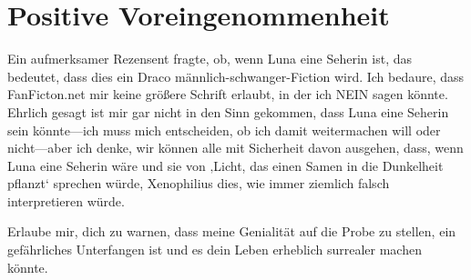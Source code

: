 \chapter{Positive Voreingenommenheit}

\begin{chapterOpeningAuthorNote}
% 
Ein aufmerksamer Rezensent fragte, ob, wenn Luna eine Seherin ist, das bedeutet, dass dies ein Draco männlich-schwanger-Fiction wird. Ich bedaure, dass FanFicton.net mir keine größere Schrift erlaubt, in der ich NEIN sagen könnte. Ehrlich gesagt ist mir gar nicht in den Sinn gekommen, dass Luna eine Seherin sein könnte—ich muss mich entscheiden, ob ich damit weitermachen will oder nicht—aber ich denke, wir können alle mit Sicherheit davon ausgehen, dass, wenn Luna eine Seherin wäre und sie von ‚Licht, das einen Samen in die Dunkelheit pflanzt‘ sprechen würde, Xenophilius dies, wie immer ziemlich falsch interpretieren würde.
\end{chapterOpeningAuthorNote}
\begin{chapterOpeningQuote}
Erlaube mir, dich zu warnen, dass meine Genialität auf die Probe zu stellen, ein gefährliches Unterfangen ist und es dein Leben erheblich surrealer machen könnte.
\end{chapterOpeningQuote}

